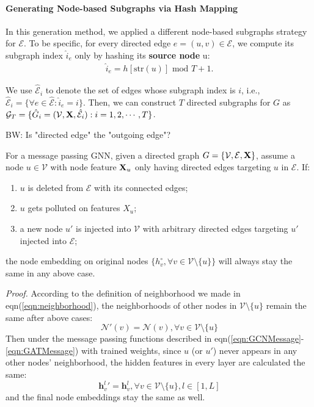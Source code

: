 \paragraph{Generating Node-based Subgraphs via Hash Mapping} In this generation method, we applied a different node-based subgraphs strategy for $\mathcal{E}$. To be specific, for every directed edge $e=(u,v)\in \mathcal{E}$, we compute its subgraph index $\hat{i}_{e}$ only by hashing its {\bf source node} u:
\begin{align}
\label{eqn:edgehash}
\hat{i}_e = h[\mathrm{str}(u)] \, \, \mathrm{mod} \, \, T+1. 
\end{align}

We use $\hat{\mathcal{E}}_i$ to denote the set of edges whose subgraph index is $i$, i.e., $\hat{\mathcal{E}}_i = \{\forall e \in \hat{\mathcal{E}}: \hat{i}_e= i \}.$ 
Then, we can construct $T$ directed subgraphs for $G$ as $\mathcal{G}_T = \{ \hat{G}_i = (\mathcal{V},{\bf X}, \hat{\mathcal{E}}_i): i=1,2,\cdots, T\}$.

{\color{red} BW: Is "directed edge" the "outgoing edge"?}

\begin{theorem}%
\label{thm:embUnchange}
For a message passing GNN, given a directed graph $G=\{\mathcal{V},\mathcal{E},{\bf X}\}$, assume a node $u\in \mathcal{V}$ with node feature ${\bf X}_{u}$ only having directed edges targeting $u$ in $\mathcal{E}$. If:
\begin{enumerate}
\item $u$ is deleted from $\mathcal{E}$ with its connected edges; 
\item $u$ gets polluted on features $X_{u}$; 
\item a new node $u'$ is injected into $\mathcal{V}$ with arbitrary directed edges targeting $u'$ injected into $\mathcal{E}$;
\end{enumerate}
the node embedding on original nodes $\{h^{\circ}_{v},\forall v\in \mathcal{V}\setminus\{u\}\}$ will always stay the same  in any above case.
\end{theorem}
\emph{Proof.} According to the definition of neighborhood we made in eqn(\ref{eqn:neighborhood}), the neighborhoods of other nodes in $\mathcal{V}\setminus\{u\}$ remain the same after above cases:
$$\mathcal{N}'(v) = \mathcal{N}(v), \forall v \in \mathcal{V}\setminus\{u\}$$
Then under the message passing functions described in eqn(\ref{eqn:GCNMessage}-\ref{eqn:GATMessage}) with trained weights, since $u$ (or $u'$) never appears in any other nodes' neighborhood, the hidden features in every layer are calculated the same:
$$\mathbf{h}_{v}^{l}{}' = \mathbf{h}_{v}^{l}, \forall v \in \mathcal{V}\setminus\{u\}, l \in [1,L]$$
and the final node embeddings stay the same as well. 


